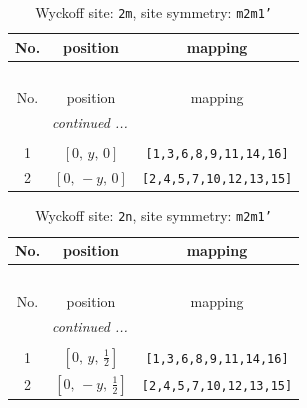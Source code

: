 \documentclass[fleqn,8pt]{jsarticle}
\begin{document}
\begin{longtable}{ccc}
\caption{Wyckoff site: {\tt 2m}, site symmetry: {\tt m2m1'}}
 \\
 \hline \hline
No. & position & mapping \\ \hline \endfirsthead

\multicolumn{2}{l}{\tablename\ \thetable{}} \\
 \hline \hline
No. & position & mapping \\ \hline \endhead

 \hline \hline
\multicolumn{2}{r}{\footnotesize\it continued ...} \\ \endfoot

 \hline \hline
\multicolumn{2}{r}{} \\ \endlastfoot

1 & $\left[ 0,\, y,\, 0 \right]$ & {\tt [1,3,6,8,9,11,14,16]} \\ \hline
2 & $\left[ 0,\, - y,\, 0 \right]$ & {\tt [2,4,5,7,10,12,13,15]} \\
\end{longtable}
\renewcommand{\arraystretch}{1.2}
\begin{longtable}{ccc}
\caption{Wyckoff site: {\tt 2n}, site symmetry: {\tt m2m1'}}
 \\
 \hline \hline
No. & position & mapping \\ \hline \endfirsthead

\multicolumn{2}{l}{\tablename\ \thetable{}} \\
 \hline \hline
No. & position & mapping \\ \hline \endhead

 \hline \hline
\multicolumn{2}{r}{\footnotesize\it continued ...} \\ \endfoot

 \hline \hline
\multicolumn{2}{r}{} \\ \endlastfoot

1 & $\left[ 0,\, y,\, \frac{1}{2} \right]$ & {\tt [1,3,6,8,9,11,14,16]} \\ \hline
2 & $\left[ 0,\, - y,\, \frac{1}{2} \right]$ & {\tt [2,4,5,7,10,12,13,15]} \\
\end{longtable}
\renewcommand{\arraystretch}{1.2}
\end{document}
